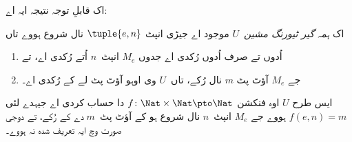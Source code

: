 \documentclass[../../../include/open-logic-section]{subfiles}
\begin{document}
اک قابلِ توجہ نتیجہ ایہ اے:

\begin{thm} اک \emph{ہمہ گیر
  ٹیورنگ مشین}~$U$ موجود اے جیڑی انپٹ $\tuple{e,n}$
  نال شروع ہووے تاں
  \begin{enumerate}
    \item اُدوں تے صرف اُدوں رُکدی اے جدوں $M_e$ انپٹ~$n$
    اُتے رُکدی اے، تے
    \item جے $M_e$ آؤٹ پٹ $m$ نال رُکے، تاں~$U$ وی
    اوہو آؤٹ پٹ لے کے رُکدی اے۔
  \end{enumerate}
  ایس طرح $U$ اوہ فنکشن $f\colon \Nat \times \Nat \pto \Nat$
  دا حساب کردی اے جیہدے لئی $f(e,n) = m$ ہووے جے $M_e$
  انپٹ~$n$ نال شروع ہو کے آؤٹ پٹ~$m$ دے کے رُکے،
  تے دوجی صورت وچ ایہ تعریف شدہ نہ ہووے۔
\end{thm}
\end{document}
